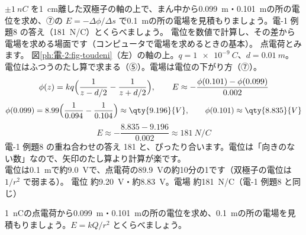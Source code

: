 \label{ph:電-2:ex7}
\begin{phreidai}[電位の傾きから電場を求める]
$\pm\qty{1}{nC}$ を\qty{1}{cm}離した双極子の軸の上で、まん中から\qty{0.099}{m}・\qty{0.101}{m}の所の電位を求め、⑦の $E=-\Delta\phi/\Delta s$ で\qty{0.1}{m}の所の電場を見積もりましょう。電-1 例題8 の答え（\qty{181}{N/C}）とくらべましょう。
\phbamen
電位を数値で計算し、その差から電場を求める場面です（コンピュータで電場を求めるときの基本）。
\phmushi
点電荷とみます。
\phzu
図\ref{ph:電-2:fig-toudeni}（左）の軸の上。$q=\qty{1e-9}{C}$、$d=\qty{0.01}{m}$。
\phriyu
電位はふつうのたし算で求まる（⑤）。電場は電位の下がり方（⑦）。
\phtateru
\[\phi(z)=kq\Bigl(\frac{1}{z-d/2}-\frac{1}{z+d/2}\Bigr),\qquad E\approx-\frac{\phi(0.101)-\phi(0.099)}{0.002}\]
\phtoku
\[\phi(0.099)=8.99\Bigl(\frac{1}{0.094}-\frac{1}{0.104}\Bigr)\approx\qty{9.196}{V},\qquad\phi(0.101)\approx\qty{8.835}{V}\]
\[E\approx-\frac{8.835-9.196}{0.002}\approx\qty{181}{N/C}\]
\phtashikame
電-1 例題8 の重ね合わせの答え 181 と、ぴったり合います。電位は「向きのない数」なので、矢印のたし算より計算が楽です。\\
電位は\qty{0.1}{m}で約\qty{9.0}{V}で、点電荷の\qty{89.9}{V}の約10分の1です（双極子の電位は $1/r^2$ で弱まる）。
\kotae 電位 約\qty{9.20}{V}・約\qty{8.83}{V}。電場 約\qty{181}{N/C}（電-1 例題8 と同じ）
\end{phreidai}
\begin{jibun}
\qty{1}{nC}の点電荷から\qty{0.099}{m}・\qty{0.101}{m}の所の電位を求め、\qty{0.1}{m}の所の電場を見積もりましょう。$E=kQ/r^2$ とくらべましょう。
\end{jibun}

